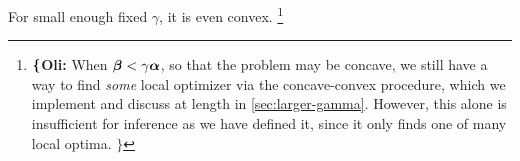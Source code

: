 \documentclass{article}
\newcommand\voli[1]{{\color{olicolor}\textbf{$\boldsymbol\{$Oli: }#1 \textbf{$\boldsymbol\}$}}}
\begin{document}
For small enough fixed $\gamma$,
it is even convex.%
\footnote{
    \voli{When $\boldsymbol\beta < \gamma \boldsymbol\alpha$,
    so that the problem may be concave,
    we still have a way to find \emph{some} local optimizer via the concave-convex procedure, which we implement and discuss at length in \cref{sec:larger-gamma}.
    However, this alone is insufficient for inference as we have defined it,
    since it only finds one of many local optima. }
    }
\end{document}
